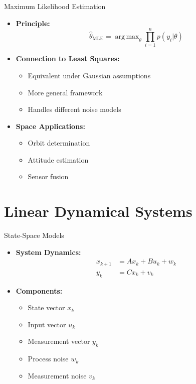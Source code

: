 \documentclass[aspectratio=169]{beamer}
\DeclareMathOperator*{\argmax}{arg\,max}
\begin{document}
\begin{frame}{Maximum Likelihood Estimation}
    \begin{itemize}
        \item<1-> \textbf{Principle:}
            \[ \hat{\theta}_{\text{MLE}} = \argmax_{\theta} \prod_{i=1}^n p(y_i|\theta) \]
        \item<2-> \textbf{Connection to Least Squares:}
            \begin{itemize}
                \item Equivalent under Gaussian assumptions
                \item More general framework
                \item Handles different noise models
            \end{itemize}
        \item<3-> \textbf{Space Applications:}
            \begin{itemize}
                \item Orbit determination
                \item Attitude estimation
                \item Sensor fusion
            \end{itemize}
    \end{itemize}
\end{frame}

\section{Linear Dynamical Systems}

\begin{frame}{State-Space Models}
    \begin{itemize}
        \item<1-> \textbf{System Dynamics:}
            \begin{align*}
                x_{k+1} &= Ax_k + Bu_k + w_k \\
                y_k &= Cx_k + v_k
            \end{align*}
        \item<2-> \textbf{Components:}
            \begin{itemize}
                \item State vector $x_k$
                \item Input vector $u_k$
                \item Measurement vector $y_k$
                \item Process noise $w_k$
                \item Measurement noise $v_k$
            \end{itemize}
    \end{itemize}
\end{frame}
\end{document}
